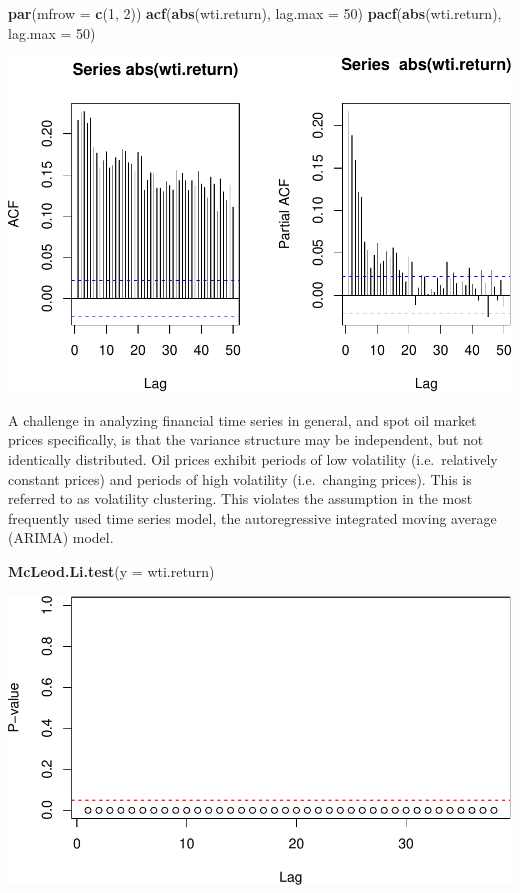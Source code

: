\documentclass[11pt,]{article}
\makeatletter
\newenvironment{Shaded}{\begin{snugshade}}{\end{snugshade}}
\newcommand{\KeywordTok}[1]{\textcolor[rgb]{0.13,0.29,0.53}{\textbf{{#1}}}}
\newcommand{\DataTypeTok}[1]{\textcolor[rgb]{0.13,0.29,0.53}{{#1}}}
\newcommand{\DecValTok}[1]{\textcolor[rgb]{0.00,0.00,0.81}{{#1}}}
\newcommand{\NormalTok}[1]{{#1}}
\def\maxwidth{\ifdim\Gin@nat@width>\linewidth\linewidth
\else\Gin@nat@width\fi}
\let\Oldincludegraphics\includegraphics
\renewcommand{\includegraphics}[1]{\Oldincludegraphics[width=\maxwidth]{#1}}
\makeatother
\begin{document}
\begin{Shaded}
\begin{Highlighting}[]
\KeywordTok{par}\NormalTok{(}\DataTypeTok{mfrow =} \KeywordTok{c}\NormalTok{(}\DecValTok{1}\NormalTok{, }\DecValTok{2}\NormalTok{))}
\KeywordTok{acf}\NormalTok{(}\KeywordTok{abs}\NormalTok{(wti.return), }\DataTypeTok{lag.max =} \DecValTok{50}\NormalTok{)}
\KeywordTok{pacf}\NormalTok{(}\KeywordTok{abs}\NormalTok{(wti.return), }\DataTypeTok{lag.max =} \DecValTok{50}\NormalTok{)}
\end{Highlighting}
\end{Shaded}

\includegraphics{JHamski_manuscript_files/figure-latex/unnamed-chunk-6-1.pdf}

A challenge in analyzing financial time series in general, and spot oil
market prices specifically, is that the variance structure may be
independent, but not identically distributed. Oil prices exhibit periods
of low volatility (i.e.~relatively constant prices) and periods of high
volatility (i.e.~changing prices). This is referred to as volatility
clustering. This violates the assumption in the most frequently used
time series model, the autoregressive integrated moving average (ARIMA)
model.

\begin{Shaded}
\begin{Highlighting}[]
\KeywordTok{McLeod.Li.test}\NormalTok{(}\DataTypeTok{y =} \NormalTok{wti.return)}
\end{Highlighting}
\end{Shaded}

\includegraphics{JHamski_manuscript_files/figure-latex/unnamed-chunk-7-1.pdf}
\end{document}

